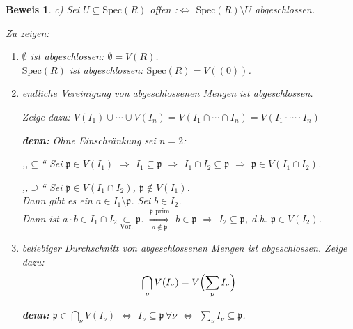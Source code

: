 \documentclass[a4paper,12pt]{scrbook}
\theoremstyle{break}
\theoremstyle{nonumberbreak}
\newtheorem{Bew}{Beweis}
\theoremstyle{nonumberplain}
\begin{document}
\begin{Bew}
c) Sei $U \subseteq \textrm{Spec}(R)$ offen :$\Leftrightarrow$ $\textrm{Spec}(R) \setminus U$ abgeschlossen.

Zu zeigen:
\begin{enumerate}
\item[(i)] $\emptyset$ ist abgeschlossen: $\emptyset = V(R)$.\\
$\textrm{Spec}(R)$ ist abgeschlossen: $\textrm{Spec}(R) = V( (0) )$.

\item[(ii)] endliche Vereinigung von abgeschlossenen Mengen ist abgeschlossen.

Zeige dazu: $V(I_1) \cup \cdots \cup V(I_n) = V(I_1 \cap \cdots \cap I_n) = V(I_1 \cdot \cdots \cdot I_n)$

\textbf{denn:} Ohne Einschränkung sei $n=2$:

,,$\subseteq$`` Sei $\mathfrak{p} \in V(I_1)$ $\Rightarrow$ $I_1 \subseteq \mathfrak{p}$ $\Rightarrow$ $I_1 \cap I_2 \subseteq \mathfrak{p}$ $\Rightarrow$ $\mathfrak{p} \in V(I_1 \cap I_2)$.

,,$\supseteq$`` Sei $\mathfrak{p} \in V(I_1 \cap I_2)$, $\mathfrak{p} \notin V(I_1)$.\\
Dann gibt es ein $a \in I_1 \setminus \mathfrak{p}$. Sei $b \in I_2$.\\
Dann ist $a \cdot b \in I_1 \cap I_2 \underset{\text{Vor.}}{\subset} \mathfrak{p}$. $\overset{\mathfrak{p}\text{ prim}}{\underset{a \notin \mathfrak{p}}{\Longrightarrow}}$ $b \in \mathfrak{p}$ $\Rightarrow$ $I_2 \subseteq \mathfrak{p}$, d.h. $\mathfrak{p} \in V(I_2)$.

\item[(iii)] beliebiger Durchschnitt von abgeschlossenen Mengen ist abgeschlossen. Zeige dazu:
$$\bigcap_\nu V(I_\nu) = V \Bigl(\sum_\nu I_\nu\Bigr)$$

\textbf{denn:} $\mathfrak{p} \in \bigcap_\nu V(I_\nu)$ $\Leftrightarrow$ $I_\nu \subseteq \mathfrak{p} \,\forall \nu$ $\Leftrightarrow$ $\sum_\nu I_\nu \subseteq \mathfrak{p}$.

\end{enumerate}

\end{Bew}
\end{document}
